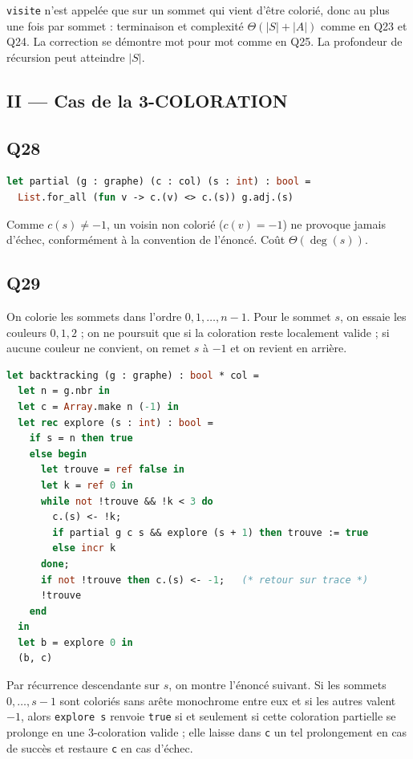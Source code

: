 \documentclass[11pt,a4paper]{article}
\begin{document}
\texttt{visite} n'est appelée que sur un sommet qui vient d'être colorié, donc au plus une fois par sommet : terminaison et complexité \(\Theta(|S| + |A|)\) comme en Q23 et Q24. La correction se démontre mot pour mot comme en Q25. La profondeur de récursion peut atteindre \(|S|\).

\hypertarget{ii-cas-de-la-3-coloration}{%
\subsection{II --- Cas de la 3-COLORATION}\label{ii-cas-de-la-3-coloration}}

\hypertarget{q28}{%
\subsection{Q28}\label{q28}}

\begin{lstlisting}[language=Caml]
let partial (g : graphe) (c : col) (s : int) : bool =
  List.for_all (fun v -> c.(v) <> c.(s)) g.adj.(s)
\end{lstlisting}

Comme \(c(s) \neq -1\), un voisin non colorié (\(c(v) = -1\)) ne provoque jamais d'échec, conformément à la convention de l'énoncé. Coût \(\Theta(\deg(s))\).

\hypertarget{q29}{%
\subsection{Q29}\label{q29}}

On colorie les sommets dans l'ordre \(0, 1, \dots, n-1\). Pour le sommet \(s\), on essaie les couleurs \(0, 1, 2\) ; on ne poursuit que si la coloration reste localement valide ; si aucune couleur ne convient, on remet \(s\) à \(-1\) et on revient en arrière.

\begin{lstlisting}[language=Caml]
let backtracking (g : graphe) : bool * col =
  let n = g.nbr in
  let c = Array.make n (-1) in
  let rec explore (s : int) : bool =
    if s = n then true
    else begin
      let trouve = ref false in
      let k = ref 0 in
      while not !trouve && !k < 3 do
        c.(s) <- !k;
        if partial g c s && explore (s + 1) then trouve := true
        else incr k
      done;
      if not !trouve then c.(s) <- -1;   (* retour sur trace *)
      !trouve
    end
  in
  let b = explore 0 in
  (b, c)
\end{lstlisting}

Par récurrence descendante sur \(s\), on montre l'énoncé suivant. Si les sommets \(0, \dots, s-1\) sont coloriés sans arête monochrome entre eux et si les autres valent \(-1\), alors \texttt{explore\ s} renvoie \texttt{true} si et seulement si cette coloration partielle se prolonge en une 3-coloration valide ; elle laisse dans \texttt{c} un tel prolongement en cas de succès et restaure \texttt{c} en cas d'échec.
\end{document}
